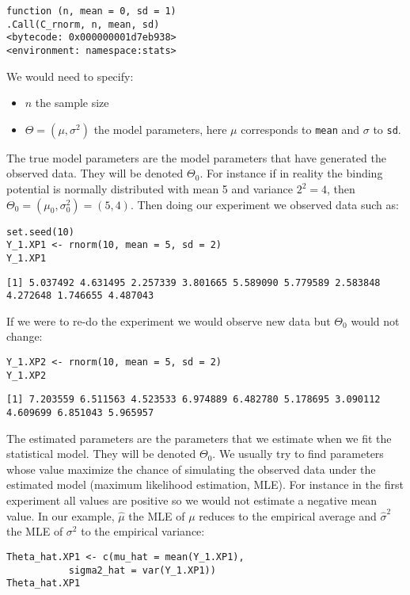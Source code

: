 \documentclass{article}
\begin{document}
\begin{verbatim}
function (n, mean = 0, sd = 1) 
.Call(C_rnorm, n, mean, sd)
<bytecode: 0x000000001d7eb938>
<environment: namespace:stats>
\end{verbatim}

We would need to specify:
\begin{itemize}
\item \(n\) the sample size
\item \(\Theta=(\mu,\sigma^2)\) the model parameters, here \(\mu\) corresponds to \texttt{mean} and \(\sigma\) to \texttt{sd}.
\end{itemize}

\bigskip

The true model parameters are the model parameters that have generated
the observed data. They will be denoted \(\Theta_0\). For instance if
in reality the binding potential is normally distributed with mean 5
and variance \(2^2=4\), then
\(\Theta_0=(\mu_0,\sigma_0^2)=(5,4)\). Then doing our experiment we
observed data such as:
\lstset{language=r,label= ,caption= ,captionpos=b,numbers=none}
\begin{lstlisting}
set.seed(10)
Y_1.XP1 <- rnorm(10, mean = 5, sd = 2)
Y_1.XP1
\end{lstlisting}

\begin{verbatim}
[1] 5.037492 4.631495 2.257339 3.801665 5.589090 5.779589 2.583848 4.272648 1.746655 4.487043
\end{verbatim}

If we were to re-do the experiment we would observe new data but \(\Theta_0\) would not change:
\lstset{language=r,label= ,caption= ,captionpos=b,numbers=none}
\begin{lstlisting}
Y_1.XP2 <- rnorm(10, mean = 5, sd = 2)
Y_1.XP2
\end{lstlisting}

\begin{verbatim}
[1] 7.203559 6.511563 4.523533 6.974889 6.482780 5.178695 3.090112 4.609699 6.851043 5.965957
\end{verbatim}

The estimated parameters are the parameters that we estimate when we
fit the statistical model. They will be denoted \(\Theta_0\). We
usually try to find parameters whose value maximize the chance of
simulating the observed data under the estimated model (maximum
likelihood estimation, MLE). For instance in the first experiment all
values are positive so we would not estimate a negative mean value. In
our example, \(\hat{\mu}\) the MLE of \(\mu\) reduces to the empirical
average and \(\hat{\sigma}^2\) the MLE of \(\sigma^2\) to the
empirical variance:
\lstset{language=r,label= ,caption= ,captionpos=b,numbers=none}
\begin{lstlisting}
Theta_hat.XP1 <- c(mu_hat = mean(Y_1.XP1),
		   sigma2_hat = var(Y_1.XP1))
Theta_hat.XP1
\end{lstlisting}
\end{document}
